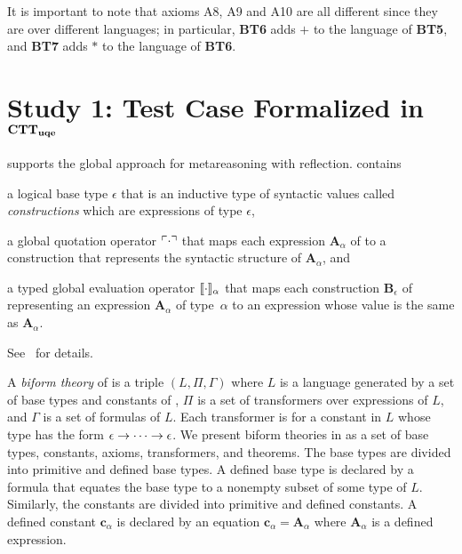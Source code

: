 \documentclass[fleqn]{llncs}
\begin{document}
It is important to note that axioms A8, A9 and A10 are all different since 
they are over different languages; in particular, {\bf BT6} adds $+$ to the
language of {\bf BT5}, and {\bf BT7} adds $*$ to the language of {\bf BT6}.

\section{Study 1: Test Case Formalized in ${\bf CTT}_{\bf uqe}$}\label{sec:cttuqe}

{\churchuqe} supports the global approach for metareasoning with
reflection.  {\churchuqe} contains%
\renewcommand{\labelenumi}{(\theenumi)}
\begin{enumerate*}
\item a logical base type $\epsilon$ that
is an inductive type of syntactic values called \emph{constructions}
which are expressions of type $\epsilon$,
\item a
global quotation operator $\ulcorner\cdot\urcorner$ that maps each expression
$\textbf{A}_\alpha$ of {\churchuqe} to a construction that represents
the syntactic structure of $\textbf{A}_\alpha$, and
\item a typed global evaluation operator $\llbracket\cdot\rrbracket_\alpha$
that maps each construction $\textbf{B}_\epsilon$ of {\churchuqe}
representing an expression $\textbf{A}_\alpha$ of type~$\alpha$ to an
expression whose value is the same as $\textbf{A}_\alpha$.
\end{enumerate*}
\renewcommand{\labelenumi}{\theenumi.}
See~\cite{FarmerArxiv17} for details.

A \emph{biform theory} of {\churchuqe} is a triple $(L,\Pi,\Gamma)$
where $L$ is a language generated by a set of base types and constants
of {\churchuqe}, $\Pi$ is a set of transformers over expressions of
$L$, and $\Gamma$ is a set of formulas of $L$.  Each transformer is
for a constant in $L$ whose type has the form $\epsilon \rightarrow \cdots
\rightarrow \epsilon$.  We present biform theories in {\churchuqe} as a
set of base types, constants, axioms, transformers, and theorems.  The
base types are divided into primitive and defined base types.  A
defined base type is declared by a formula that equates the base type
to a nonempty subset of some type of $L$.  Similarly, the constants
are divided into primitive and defined constants.  A defined constant
$\textbf{c}_\alpha$ is declared by an equation $\textbf{c}_\alpha =
\textbf{A}_\alpha$ where $\textbf{A}_\alpha$ is a defined expression.
\end{document}
